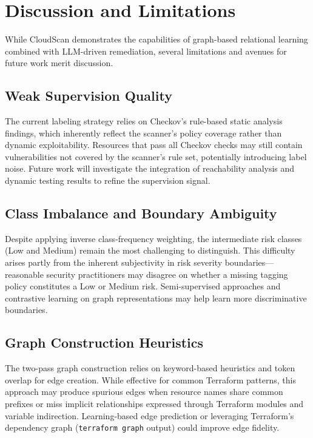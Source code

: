 \documentclass[conference]{IEEEtran}
\begin{document}
\section{Discussion and Limitations}

While CloudScan demonstrates the capabilities of graph-based relational learning combined with LLM-driven remediation, several limitations and avenues for future work merit discussion.

\subsection{Weak Supervision Quality}

The current labeling strategy relies on Checkov's rule-based static analysis findings, which inherently reflect the scanner's policy coverage rather than dynamic exploitability. Resources that pass all Checkov checks may still contain vulnerabilities not covered by the scanner's rule set, potentially introducing label noise. Future work will investigate the integration of reachability analysis and dynamic testing results to refine the supervision signal.

\subsection{Class Imbalance and Boundary Ambiguity}

Despite applying inverse class-frequency weighting, the intermediate risk classes (Low and Medium) remain the most challenging to distinguish. This difficulty arises partly from the inherent subjectivity in risk severity boundaries---reasonable security practitioners may disagree on whether a missing tagging policy constitutes a Low or Medium risk. Semi-supervised approaches and contrastive learning on graph representations may help learn more discriminative boundaries.

\subsection{Graph Construction Heuristics}

The two-pass graph construction relies on keyword-based heuristics and token overlap for edge creation. While effective for common Terraform patterns, this approach may produce spurious edges when resource names share common prefixes or miss implicit relationships expressed through Terraform modules and variable indirection. Learning-based edge prediction or leveraging Terraform's dependency graph (\texttt{terraform graph} output) could improve edge fidelity.
\end{document}

